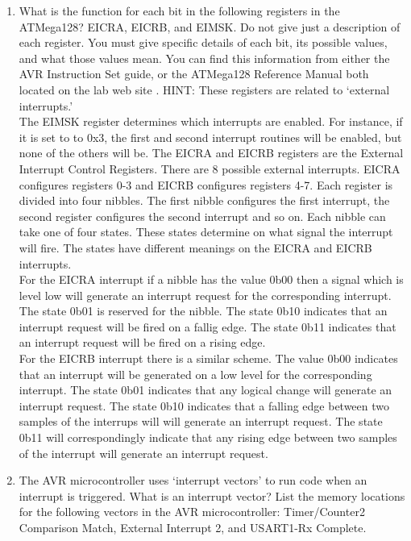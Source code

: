 \documentclass[12pt,letterpaper]{article}
\begin{document}
\begin{enumerate}
    \item What is the function for each bit in the following registers in the
    ATMega128? EICRA, EICRB, and EIMSK. Do not give just a description of each
    register. You must give specific details of each bit, its possible values,
    and what those values mean.  You can find this information from either the
    AVR Instruction Set guide, or the ATMega128 Reference Manual both located
    on the lab web site .  HINT:  These  registers  are  related  to  ‘external
    interrupts.’\\
    The EIMSK register determines which interrupts are enabled. For instance,
if it is set to to 0x3, the first and second interrupt routines will be
enabled, but none of the others will be.
    The EICRA and EICRB registers are the External Interrupt Control Registers.
    There are 8 possible external interrupts. EICRA configures registers 0-3
    and EICRB configures registers 4-7. Each register is divided into four
    nibbles. The first nibble configures the first interrupt, the second
    register configures the second interrupt and so on. Each nibble can take
    one of four states. These states determine on what signal the interrupt
    will fire. The states have different meanings on the EICRA and EICRB
    interrupts.\\
    For the EICRA interrupt if a nibble has the value 0b00 then a signal which is
    level low will generate an interrupt request for the corresponding
    interrupt. The state 0b01 is reserved for the nibble. The state 0b10
    indicates that an interrupt request will be fired on a fallig edge. The
    state 0b11 indicates that an interrupt request will be fired on a rising
    edge.\\
    For the EICRB interrupt there is a similar scheme. The value 0b00 indicates
    that an interrupt will be generated on a low level for the corresponding
    interrupt. The state 0b01 indicates that any logical change will generate
    an interrupt request. The state 0b10 indicates that a falling edge between
    two samples of the interrups will will generate an interrupt request. The
    state 0b11 will correspondingly indicate that any rising edge between two
    samples of the interrupt will generate an interrupt request.

    \item The  AVR  microcontroller  uses  ‘interrupt  vectors’  to  run  code  when  an  interrupt  is  triggered.  What  is  an  interrupt  vector?  List the memory locations for the following vectors in the AVR microcontroller: Timer/Counter2 Comparison Match, External Interrupt 2, and USART1-Rx Complete.\\


\end{enumerate}
\end{document}
